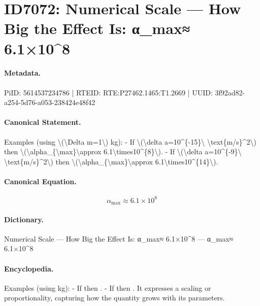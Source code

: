 \section*{ID7072: Numerical Scale — How Big the Effect Is: α\_max≈ 6.1×10\textasciicircum{}8}
\paragraph{Metadata.}
PiID: 5614537234786 | RTEID: RTE:P27462.1465:T1.2669 | UUID: 3f92ad82-a254-5d76-a053-238424e48f42

\paragraph{Canonical Statement.}
Examples (using \textbackslash{}(\textbackslash{}Delta m=1\textbackslash{}) kg): - If \textbackslash{}(\textbackslash{}delta a=10\textasciicircum{}\{-15\}\textbackslash{} \textbackslash{}text\{m/s\}\textasciicircum{}2\textbackslash{}) then \textbackslash{}(\textbackslash{}alpha\_\{\textbackslash{}max\}\textbackslash{}approx 6.1\textbackslash{}times10\textasciicircum{}\{8\}\textbackslash{}). - If \textbackslash{}(\textbackslash{}delta a=10\textasciicircum{}\{-9\}\textbackslash{} \textbackslash{}text\{m/s\}\textasciicircum{}2\textbackslash{}) then \textbackslash{}(\textbackslash{}alpha\_\{\textbackslash{}max\}\textbackslash{}approx 6.1\textbackslash{}times10\textasciicircum{}\{14\}\textbackslash{}).

\paragraph{Canonical Equation.}
\[
\alpha_{\max}\approx 6.1\times10^{8}
\]

\paragraph{Dictionary.}
Numerical Scale — How Big the Effect Is: α\_max≈ 6.1×10\textasciicircum{}8 — α\_max≈ 6.1×10\textasciicircum{}8

\paragraph{Encyclopedia.}
Examples (using kg): - If then . - If then . It expresses a scaling or proportionality, capturing how the quantity grows with its parameters.
